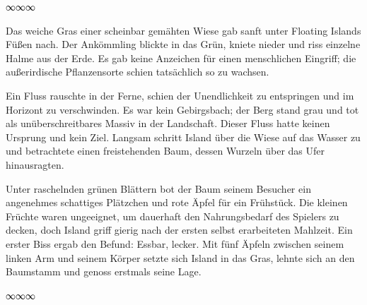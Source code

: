 \begin{center}
∞∞∞
\end{center}

Das weiche Gras einer scheinbar gemähten Wiese gab sanft unter Floating Islands Füßen nach. Der Ankömmling blickte in das Grün, kniete nieder und riss einzelne Halme aus der Erde. Es gab keine Anzeichen für einen menschlichen Eingriff; die außerirdische Pflanzensorte schien tatsächlich so zu wachsen.

Ein Fluss rauschte in der Ferne, schien der Unendlichkeit zu entspringen und im Horizont zu verschwinden. Es war kein Gebirgsbach; der Berg stand grau und tot als unüberschreitbares Massiv in der Landschaft. Dieser Fluss hatte keinen Ursprung und kein Ziel. Langsam schritt Island über die Wiese auf das Wasser zu und betrachtete einen freistehenden Baum, dessen Wurzeln über das Ufer hinausragten.

Unter raschelnden grünen Blättern bot der Baum seinem Besucher ein angenehmes schattiges Plätzchen und rote Äpfel für ein Frühstück. Die kleinen Früchte waren ungeeignet, um dauerhaft den Nahrungsbedarf des Spielers zu decken, doch Island griff gierig nach der ersten selbst erarbeiteten Mahlzeit. Ein erster Biss ergab den Befund: Essbar, lecker. Mit fünf Äpfeln zwischen seinem linken Arm und seinem Körper setzte sich Island in das Gras, lehnte sich an den Baumstamm und genoss erstmals seine Lage.

\begin{center}
∞∞∞
\end{center}

